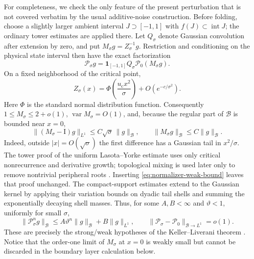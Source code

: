 \documentclass[11pt]{article}
\theoremstyle{definition}
\theoremstyle{remark}
\newcommand{\uc}{u_{\mathrm c}}
\newcommand{\cP}{\mathcal P}
\newcommand{\Id}{\mathrm I}
\begin{document}
For completeness, we check the only feature of the present perturbation that
is not covered verbatim by the usual additive-noise construction.  Before
folding, choose a slightly larger ambient interval $J\supset[-1,1]$ with
$f(J)\subset\operatorname{int}J$; the ordinary tower estimates are applied
there.  Let $Q_\sigma$ denote Gaussian convolution after extension by zero,
and put $M_\sigma g=Z_\sigma^{-1}g$.  Restriction and conditioning on the
physical state interval then have the exact factorization
\begin{equation}\label{eq:conditioned-factorization}
 \cP_\sigma g
 =\mathbf1_{[-1,1]}Q_\sigma\cP_0(M_\sigma g).
\end{equation}
On a fixed neighborhood of the critical point,
\begin{equation}\label{eq:normalizer-local}
 Z_\sigma(x)
 =\Phi\!\left(\frac{\uc x^2}{\sigma}\right)
  +O(e^{-c/\sigma^2}).
\end{equation}
Here $\Phi$ is the standard normal distribution function.
Consequently $1\le M_\sigma\le2+o(1)$,
$\operatorname{var}M_\sigma=O(1)$, and, because the regular part of
$\mathcal B$ is bounded near $x=0$,
\begin{equation}\label{eq:normalizer-weak-bound}
 \|(M_\sigma-\Id)g\|_{L^1}
 \le C\sqrt\sigma\,\|g\|_{\mathcal B},
 \qquad
 \|M_\sigma g\|_{\mathcal B}
 \le C\|g\|_{\mathcal B}.
\end{equation}
Indeed, outside $|x|=O(\sqrt\sigma)$ the first difference has a Gaussian
tail in $x^2/\sigma$.  The tower proof of the uniform Lasota--Yorke estimate
uses only critical nonrecurrence and derivative growth; topological mixing is
used later only to remove nontrivial peripheral roots
\citep{BaladiViana1996}.  Inserting \eqref{eq:normalizer-weak-bound} leaves
that proof unchanged.  The compact-support estimates extend to the Gaussian
kernel by applying their variation bounds on dyadic tail shells and summing
the exponentially decaying shell masses.  Thus, for some $A,B<\infty$
and $\vartheta<1$, uniformly for small $\sigma$,
\begin{equation}\label{eq:strong-weak-estimates}
 \|\cP_\sigma^n g\|_{\mathcal B}
 \le A\vartheta^n\|g\|_{\mathcal B}+B\|g\|_{L^1},
 \qquad
 \|\cP_\sigma-\cP_0\|_{\mathcal B\to L^1}=o(1).
\end{equation}
These are precisely the strong/weak hypotheses of the Keller--Liverani
theorem \citep{KellerLiverani1999}.  Notice that the order-one limit of
$M_\sigma$ at $x=0$ is weakly small but cannot be discarded in the boundary
layer calculation below.
\end{document}
